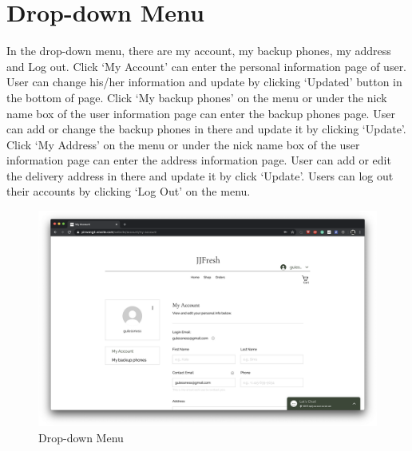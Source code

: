 \clearpage
\section*{Drop-down Menu}
In the drop-down menu, there are my account, my backup phones, my address and Log out. Click ‘My Account’ can enter the personal information page of user. User can change his/her information and update by clicking ‘Updated’ button in the bottom of page.
Click ‘My backup phones’ on the menu or under the nick name box of the user information page can enter the backup phones page. User can add or change the backup phones in there and update it by clicking ‘Update’.
Click ‘My Address’ on the menu or under the nick name box of the user information page can enter the address information page. User can add or edit the delivery address in there and update it by click ‘Update’. 
Users can log out their accounts by clicking ‘Log Out’ on the menu.
\begin{figure}[htp]
\centering
\includegraphics[width=\textwidth]{Figures/dropdown.png}
\caption{Drop-down Menu}
\label{fig:dropdown}
\end{figure}

\clearpage
